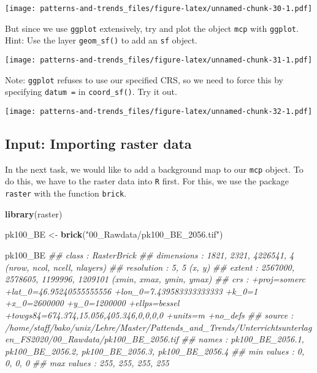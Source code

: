 \documentclass[]{book}
\newenvironment{Shaded}{\begin{snugshade}}{\end{snugshade}}
\newcommand{\CommentTok}[1]{\textcolor[rgb]{0.56,0.35,0.01}{\textit{#1}}}
\newcommand{\KeywordTok}[1]{\textcolor[rgb]{0.13,0.29,0.53}{\textbf{#1}}}
\newcommand{\NormalTok}[1]{#1}
\newcommand{\StringTok}[1]{\textcolor[rgb]{0.31,0.60,0.02}{#1}}
\begin{document}
\texttt{[image: patterns-and-trends\_files/figure-latex/unnamed-chunk-30-1.pdf]}

But since we use \texttt{ggplot} extensively, try and plot the object \texttt{mcp} with \texttt{ggplot}. Hint: Use the layer \texttt{geom\_sf()} to add an \texttt{sf} object.

\texttt{[image: patterns-and-trends\_files/figure-latex/unnamed-chunk-31-1.pdf]}

Note: \texttt{ggplot} refuses to use our specified CRS, so we need to force this by specifying \texttt{datum\ =} in \texttt{coord\_sf()}. Try it out.

\texttt{[image: patterns-and-trends\_files/figure-latex/unnamed-chunk-32-1.pdf]}

\hypertarget{input-importing-raster-data}{%
\subsection{Input: Importing raster data}\label{input-importing-raster-data}}

In the next task, we would like to add a background map to our \texttt{mcp} object. To do this, we have to the raster data into \texttt{R} first. For this, we use the package \texttt{raster} with the function \texttt{brick}.

\begin{Shaded}
\begin{Highlighting}[]

\KeywordTok{library}\NormalTok{(raster)}

\NormalTok{pk100_BE <-}\StringTok{ }\KeywordTok{brick}\NormalTok{(}\StringTok{"00_Rawdata/pk100_BE_2056.tif"}\NormalTok{)}

\NormalTok{pk100_BE}
\CommentTok{## class      : RasterBrick }
\CommentTok{## dimensions : 1821, 2321, 4226541, 4  (nrow, ncol, ncell, nlayers)}
\CommentTok{## resolution : 5, 5  (x, y)}
\CommentTok{## extent     : 2567000, 2578605, 1199996, 1209101  (xmin, xmax, ymin, ymax)}
\CommentTok{## crs        : +proj=somerc +lat_0=46.95240555555556 +lon_0=7.439583333333333 +k_0=1 +x_0=2600000 +y_0=1200000 +ellps=bessel +towgs84=674.374,15.056,405.346,0,0,0,0 +units=m +no_defs }
\CommentTok{## source     : /home/staff/bako/unix/Lehre/Master/Pattends_and_Trends/Unterrichtsunterlagen_FS2020/00_Rawdata/pk100_BE_2056.tif }
\CommentTok{## names      : pk100_BE_2056.1, pk100_BE_2056.2, pk100_BE_2056.3, pk100_BE_2056.4 }
\CommentTok{## min values :               0,               0,               0,               0 }
\CommentTok{## max values :             255,             255,             255,             255}
\end{Highlighting}
\end{Shaded}
\end{document}
